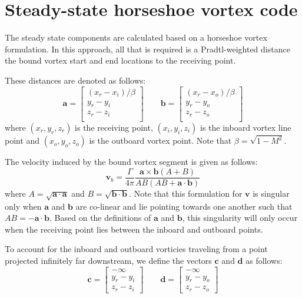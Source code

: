 \documentclass[12pt]{article}
\newcommand{\f}{\frac}
\newcommand{\mb}{\mathbf}
\begin{document}
\section{Steady-state horseshoe vortex code}

The steady state components are calculated based on a horseshoe vortex
formulation. In this approach, all that is required is a
Pradtl-weighted distance the bound vortex start and end locations to
the receiving point. 

These distances are denoted as follows:
%
\begin{equation*}
  \mb{a} = \begin{bmatrix} 
    (x_{r} - x_{i})/\beta \\
    y_r - y_i \\
    z_r - z_i \\
  \end{bmatrix}
  \qquad
  \mb{b} = \begin{bmatrix} 
    (x_{r} - x_{o})/\beta \\
    y_r - y_o \\
    z_r - z_o \\
  \end{bmatrix}
\end{equation*}
%
where $(x_r, y_r, z_r)$ is the receiving point, $(x_{i}, y_{i},
z_{i})$ is the inboard vortex line point and $(x_{o}, y_{o}, z_{o})$
is the outboard vortex point. Note that $\beta = \sqrt{1 - M^2}$.

The velocity induced by the bound vortex segment is given as follows:
%
\begin{equation*}
  \mb{v}_{b} = \f{\Gamma}{4\pi} \f{\mb{a} \times \mb{b} (A + B)}{AB(AB + \mb{a}\cdot \mb{b})}
\end{equation*}
where $A = \sqrt{\mb{a}\cdot \mb{a}}$ and $B =
\sqrt{\mb{b}\cdot\mb{b}}$.  Note that this formulation for $\mb{v}$ is
singular only when $\mb{a}$ and $\mb{b}$ are co-linear and lie
pointing towards one another such that $AB = - \mb{a}\cdot \mb{b}$.
Based on the definitions of $\mb{a}$ and $\mb{b}$, this singularity
will only occur when the receiving point lies between the inboard and
outboard points.

To account for the inboard and outboard vorticies traveling from a
point projected infinitely far downstream, we define the vectors
$\mb{c}$ and $\mb{d}$ as follows:
%
\begin{equation*}
  \mb{c} = \begin{bmatrix}
    -\infty \\
    y_{r} - y_{i} \\ 
    z_{r} - z_{i}
  \end{bmatrix}
  \qquad
  \mb{d} = \begin{bmatrix}
    -\infty \\
    y_{r} - y_{o} \\ 
    z_{r} - z_{o}
  \end{bmatrix}
\end{equation*}
\end{document}
